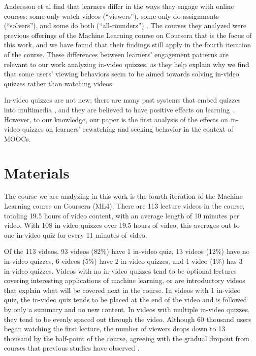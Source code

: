 \documentclass[letterpaper]{article}
\begin{document}
Andersson et al find that learners differ in the ways they engage with online courses: some only watch videos (``viewers''), some only do assignments (``solvers''), and some do both (``all-rounders'') \cite{ashton}. The courses they analyzed were previous offerings of the Machine Learning course on Coursera that is the focus of this work, and we have found that their findings still apply in the fourth iteration of the course. These differences between learners' engagement patterns are relevant to our work analyzing in-video quizzes, as they help explain why we find that some users' viewing behaviors seem to be aimed towards solving in-video quizzes rather than watching videos.

In-video quizzes are not new; there are many past systems that embed quizzes into multimedia \cite{multimedia}, and they are believed to have positive effects on learning \cite{embedded}. However, to our knowledge, our paper is the first analysis of the effects on in-video quizzes on learners' rewatching and seeking behavior in the context of MOOCs.

\newpage

\section{Materials}

The course we are analyzing in this work is the fourth iteration of the Machine Learning course on Coursera (ML4). There are 113 lecture videos in the course, totaling 19.5 hours of video content, with an average length of 10 minutes per video.  With 108 in-video quizzes over 19.5 hours of video, this averages out to one in-video quiz for every 11 minutes of video.

Of the 113 videos, 93 videos (82\%) have 1 in-video quiz, 13 videos (12\%) have no in-video quizzes, 6 videos (5\%) have 2 in-video quizzes, and 1 video (1\%) has 3 in-video quizzes. Videos with no in-video quizzes tend to be optional lectures covering interesting applications of machine learning, or are introductory videos that explain what will be covered next in the course. In videos with 1 in-video quiz, the in-video quiz tends to be placed at the end of the video and is followed by only a summary and no new content. In videos with multiple in-video quizzes, they tend to be evenly spaced out through the video. Although 60 thousand users began watching the first lecture, the number of viewers drops down to 13 thousand by the half-point of the course, agreeing with the gradual dropout from courses that previous studies have observed \cite{dropout}.
\end{document}
